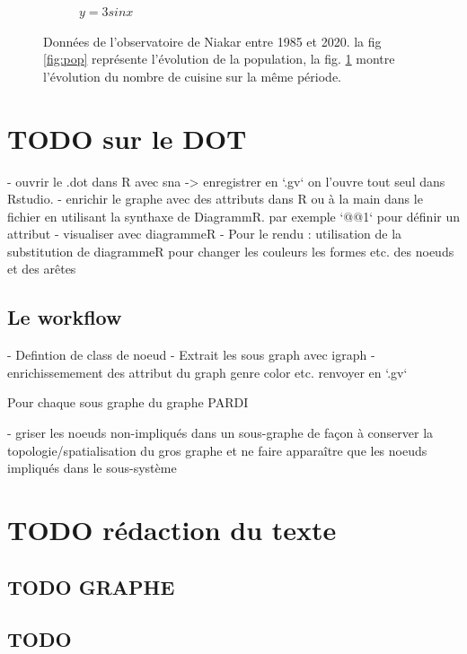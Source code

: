 \begin{figure}
\begin{subfigure}[b]{0.45\textwidth}
         \caption{$y=3sinx$}
         \label{fig:cuisines}
     \end{subfigure}
        \caption{Données de l'observatoire de Niakar entre 1985 et 2020. la fig \ref{fig:pop} représente l'évolution de la population, la fig. \ref{fig:cuisines} montre l'évolution du nombre de cuisine sur la même période.}
        \label{fig:three graphs}
\end{figure}


\section{ TODO sur le DOT}



- ouvrir le .dot dans R avec sna -> enregistrer en `.gv` on l'ouvre tout seul dans Rstudio.
- enrichir le graphe avec des attributs dans R ou à la main dans le fichier en utilisant la synthaxe de DiagrammR. par exemple `@@1` pour définir un attribut
- visualiser avec diagrammeR
- Pour le rendu : utilisation de la substitution de diagrammeR pour changer les couleurs les formes etc.  des noeuds et des arêtes

\subsection{ Le workflow}
- Defintion de class de noeud
- Extrait les sous graph avec igraph
- enrichissemement des attribut du graph genre color etc.
renvoyer en `.gv`

Pour chaque sous graphe du graphe PARDI

-  griser les noeuds non-impliqués dans un sous-graphe de façon à conserver la topologie/spatialisation du gros graphe et ne faire apparaître que les noeuds impliqués dans le sous-système



\section{TODO rédaction du texte }

\subsection{TODO GRAPHE}

\subsection{ TODO }

